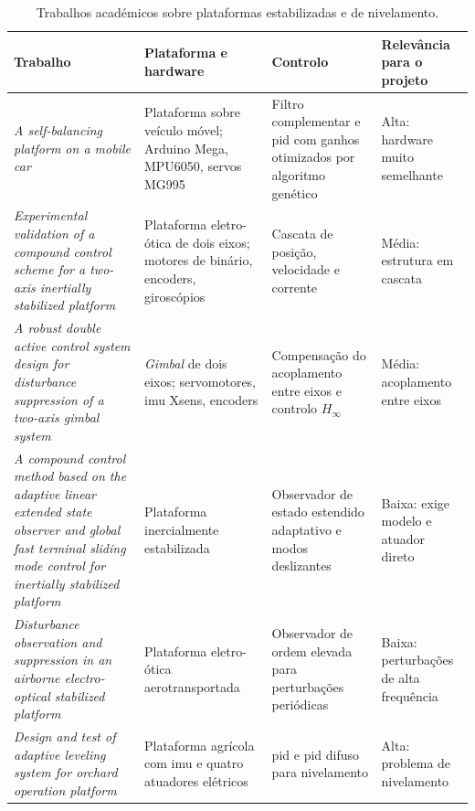 \begin{table}[H]
\centering\small
\caption{Trabalhos académicos sobre plataformas estabilizadas e de nivelamento.}
\begin{tabularx}{\textwidth}{>{\raggedright\arraybackslash}p{3.8cm}YYY}
\toprule
Trabalho & Plataforma e hardware & Controlo & Relevância para o projeto\\\midrule
\textit{A self-balancing platform on a mobile car} \cite{tawfeeq2022} & Plataforma sobre veículo móvel; Arduino Mega, MPU6050, servos MG995 & Filtro complementar e \acrshort{pid} com ganhos otimizados por algoritmo genético & Alta: hardware muito semelhante\\\addlinespace[0.7em]
\textit{Experimental validation of a compound control scheme for a two-axis inertially stabilized platform} \cite{zhou2016} & Plataforma eletro-ótica de dois eixos; motores de binário, encoders, giroscópios & Cascata de posição, velocidade e corrente & Média: estrutura em cascata\\\addlinespace[0.7em]
\textit{A robust double active control system design for disturbance suppression of a two-axis gimbal system} \cite{lee2020} & \textit{Gimbal} de dois eixos; servomotores, \acrshort{imu} Xsens, encoders & Compensação do acoplamento entre eixos e controlo $H_\infty$ & Média: acoplamento entre eixos\\\addlinespace[0.7em]
\textit{A compound control method based on the adaptive linear extended state observer and global fast terminal sliding mode control for inertially stabilized platform} \cite{fu2022} & Plataforma inercialmente estabilizada & Observador de estado estendido adaptativo e modos deslizantes & Baixa: exige modelo e atuador direto\\\addlinespace[0.7em]
\textit{Disturbance observation and suppression in an airborne electro-optical stabilized platform} \cite{wang2024} & Plataforma eletro-ótica aerotransportada & Observador de ordem elevada para perturbações periódicas & Baixa: perturbações de alta frequência\\\addlinespace[0.7em]
\textit{Design and test of adaptive leveling system for orchard operation platform} \cite{guo2025} & Plataforma agrícola com \acrshort{imu} e quatro atuadores elétricos & \acrshort{pid} e \acrshort{pid} difuso para nivelamento & Alta: problema de nivelamento\\
\bottomrule
\end{tabularx}
\label{tab:academicas}
\end{table}

